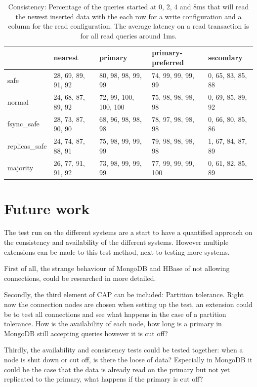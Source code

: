 \documentclass[10pt,conference,letterpaper]{IEEEtran}
\begin{document}
\begin{table}
\centering
\begin{tabular}{l | l l l l}
& nearest & primary & primary- \newline preferred & secondary \\ 
  \hline
safe & 28, 69, 89, 91, 92 & 80, 98, 98, 99, 99 & 74, 99, 99, 99, 99 & 0, 65, 83, 85, 88 \\ 
  normal & 24, 68, 87, 89, 92 & 72, 99, 100, 100, 100 & 75, 98, 98, 98, 98 & 0, 69, 85, 89, 92 \\ 
  fsync\_safe & 28, 73, 87, 90, 90 & 68, 96, 98, 98, 98 & 78, 97, 98, 98, 98 & 0, 66, 80, 85, 86 \\ 
  replicas\_safe & 24, 74, 87, 88, 91 & 75, 98, 99, 99, 99 & 79, 98, 98, 98, 98 & 1, 67, 84, 87, 89 \\ 
  majority & 26, 77, 91, 91, 92 & 73, 98, 99, 99, 99 & 77, 99, 99, 99, 100 & 0, 61, 82, 85, 89 \\ 
\end{tabular}
	\caption{Consistency: Percentage of the queries started at 0, 2, 4 and 8ms  that will read the newest inserted data with the each row for a write configuration and a column for the read configuration. The average latency on a read transaction is for all read queries around 1ms. }
	\label{table:consistentie-mongodb-correct}
\end{table}


\section{Future work}\label{sec:futurework}
The test run on the different systems are a start to have a quantified approach on the consistency and availability of the different systems. However multiple extensions can be made to this test method, next to testing more systems. 

First of all, the strange behaviour of MongoDB and HBase of not allowing connections, could be researched in more detailed. 

Secondly, the third element of CAP can be included: Partition tolerance. Right now the connection nodes are chosen when setting up the test, an extension could be to test all connections and see what happens in the case of a partition tolerance. How is the availability of each node, how long is a primary in MongoDB still accepting queries however it is cut off? 

Thirdly, the availability and consistency tests could be tested together: when a node is shut down or cut off, is there the loose of data? Especially in MongoDB it could be the case that the data is already read on the primary but not yet replicated to the primary, what happens if the primary is cut off? 
\end{document}
